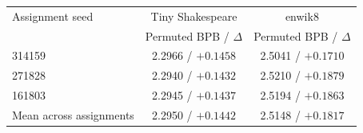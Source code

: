 \begin{tabular}{lcc}
\toprule
Assignment seed & Tiny Shakespeare & enwik8 \\
 & Permuted BPB / $\Delta$ & Permuted BPB / $\Delta$ \\
\midrule
314159 & 2.2966 / $+0.1458$ & 2.5041 / $+0.1710$ \\
271828 & 2.2940 / $+0.1432$ & 2.5210 / $+0.1879$ \\
161803 & 2.2945 / $+0.1437$ & 2.5194 / $+0.1863$ \\
\midrule
Mean across assignments & 2.2950 / $+0.1442$ & 2.5148 / $+0.1817$ \\
\bottomrule
\end{tabular}
